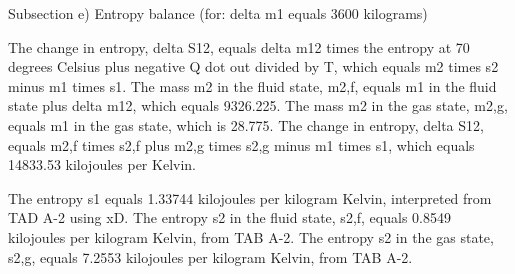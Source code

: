 Subsection e) Entropy balance (for: delta m1 equals 3600 kilograms)

The change in entropy, delta S12, equals delta m12 times the entropy at 70 degrees Celsius plus negative Q dot out divided by T, which equals m2 times s2 minus m1 times s1. The mass m2 in the fluid state, m2,f, equals m1 in the fluid state plus delta m12, which equals 9326.225. The mass m2 in the gas state, m2,g, equals m1 in the gas state, which is 28.775. The change in entropy, delta S12, equals m2,f times s2,f plus m2,g times s2,g minus m1 times s1, which equals 14833.53 kilojoules per Kelvin.

The entropy s1 equals 1.33744 kilojoules per kilogram Kelvin, interpreted from TAD A-2 using xD. The entropy s2 in the fluid state, s2,f, equals 0.8549 kilojoules per kilogram Kelvin, from TAB A-2. The entropy s2 in the gas state, s2,g, equals 7.2553 kilojoules per kilogram Kelvin, from TAB A-2.